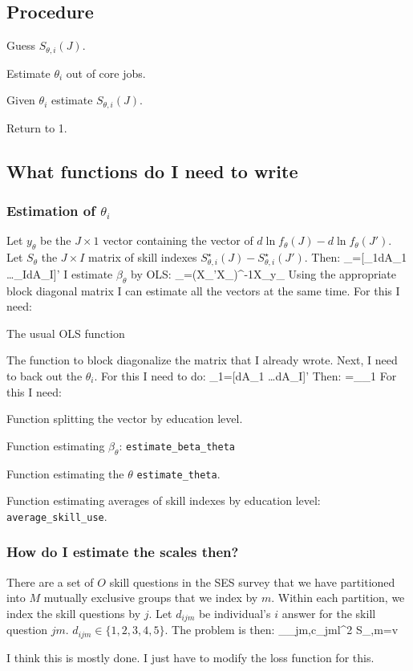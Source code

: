 \documentclass[a4paper, 12pt]{article}
\begin{document}
\subsection{Procedure}
\benu
	\item Guess $S_{\theta,i}(J)$.
	\item Estimate $\theta_i$ out of core jobs. %
	\item Given $\theta_i$ estimate $S_{\theta,i}(J)$.
	\item Return to 1.
\eenu

\subsection{What functions do I need to write}
\subsubsection{Estimation of $\theta_i$}
Let $y_\theta$ be the $J\times 1$ vector containing the vector of $d\ln f_\theta(J)-d\ln f_\theta(J')$. Let $S_\theta$ the $J\times I$ matrix of skill indexes $S^\star_{\theta,i}(J)-S^\star_{\theta,i}(J')$. Then:
\beqns
	\beta_\theta=[\theta_1d\ln A_1 \dots \theta_Id\ln A_I]'
\eeqns
I estimate $\beta_\theta$ by OLS:
\beqns
	\beta_\theta=(X_\theta'X_\theta)^{-1}X_\theta y_\theta
\eeqns
Using the appropriate block diagonal matrix I can estimate all the vectors at the same time. For this I need:
\bitem
\item The usual OLS function
\item The function to block diagonalize the matrix that I already wrote.
\eitem 
Next, I need to back out the $\theta_i$. For this I need to do:
\beqns
	\beta_1=[d\ln A_1 \dots d\ln A_I]'
\eeqns
Then:
\beqns
	\theta=\beta_\theta\oslash\beta_1
\eeqns
For this I need:
\bitem
	\item Function splitting the vector by education level.
	\item Function estimating $\beta_{\theta}$: {\tt estimate\_beta\_theta}
	\item Function estimating the $\theta$ {\tt estimate\_theta}.
	\item Function estimating averages of skill indexes by education level: {\tt average\_skill\_use}.
\eitem 
\subsubsection{How do I estimate the scales then?}
There are a set of $O$ skill questions in the SES survey that we have partitioned into $M$ mutually exclusive groups that we index by $m$. Within each partition, we index the skill questions by $j$. Let $d_{ijm}$ be individual's $i$ answer for the skill question $jm$. $d_{ijm}\in\{1,2,3,4,5\}$. The problem is then:
\beqns
	\min_{\alpha_{jm},c_{jml}}\left[\sum_{m=1}^I\theta_jS_{\theta,m}\right]^2   S_{\theta,m}=v
\eeqns
\bitem
	\item I think this is mostly done. I just have to modify the loss function for this.
\eitem 

{}
\end{document}
